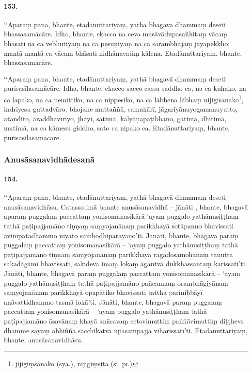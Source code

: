 \paragraph{153.} ‘‘Aparaṃ pana, bhante, etadānuttariyaṃ, yathā bhagavā dhammaṃ deseti bhassasamācāre. Idha, bhante, ekacco na ceva musāvādupasañhitaṃ vācaṃ bhāsati na ca vebhūtiyaṃ na ca pesuṇiyaṃ na ca sārambhajaṃ jayāpekkho; mantā mantā ca vācaṃ bhāsati nidhānavatiṃ kālena. Etadānuttariyaṃ, bhante, bhassasamācāre.

‘‘Aparaṃ pana, bhante, etadānuttariyaṃ, yathā bhagavā dhammaṃ deseti purisasīlasamācāre. Idha, bhante, ekacco sacco cassa saddho ca, na ca kuhako, na ca lapako, na ca nemittiko, na ca nippesiko, na ca lābhena lābhaṃ nijigīsanako\footnote{jijigiṃsanako (syā.), nijigiṃsitā (sī. pī.)}, indriyesu guttadvāro, bhojane mattaññū, samakārī, jāgariyānuyogamanuyutto, atandito, āraddhavīriyo, jhāyī, satimā, kalyāṇapaṭibhāno, gatimā, dhitimā, matimā, na ca kāmesu giddho, sato ca nipako ca. Etadānuttariyaṃ, bhante, purisasīlasamācāre.

\subsubsection{Anusāsanavidhādesanā}

\paragraph{154.} ‘‘Aparaṃ pana, bhante, etadānuttariyaṃ, yathā bhagavā dhammaṃ deseti anusāsanavidhāsu. Catasso imā bhante anusāsanavidhā – jānāti , bhante, bhagavā aparaṃ puggalaṃ paccattaṃ yonisomanasikārā ‘ayaṃ puggalo yathānusiṭṭhaṃ tathā paṭipajjamāno tiṇṇaṃ saṃyojanānaṃ parikkhayā sotāpanno bhavissati avinipātadhammo niyato sambodhiparāyaṇo’ti. Jānāti, bhante, bhagavā paraṃ puggalaṃ paccattaṃ yonisomanasikārā – ‘ayaṃ puggalo yathānusiṭṭhaṃ tathā paṭipajjamāno tiṇṇaṃ saṃyojanānaṃ parikkhayā rāgadosamohānaṃ tanuttā sakadāgāmī bhavissati, sakideva imaṃ lokaṃ āgantvā dukkhassantaṃ karissatī’ti. Jānāti, bhante, bhagavā paraṃ puggalaṃ paccattaṃ yonisomanasikārā – ‘ayaṃ puggalo yathānusiṭṭhaṃ tathā paṭipajjamāno pañcannaṃ orambhāgiyānaṃ saṃyojanānaṃ parikkhayā opapātiko bhavissati tattha parinibbāyī anāvattidhammo tasmā lokā’ti. Jānāti, bhante, bhagavā paraṃ puggalaṃ paccattaṃ yonisomanasikārā – ‘ayaṃ puggalo yathānusiṭṭhaṃ tathā paṭipajjamāno āsavānaṃ khayā anāsavaṃ cetovimuttiṃ paññāvimuttiṃ diṭṭheva dhamme sayaṃ abhiññā sacchikatvā upasampajja viharissatī’ti. Etadānuttariyaṃ, bhante, anusāsanavidhāsu.

